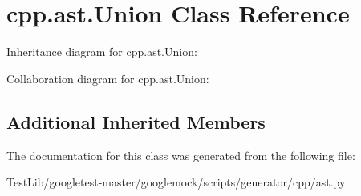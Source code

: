 \hypertarget{classcpp_1_1ast_1_1Union}{}\section{cpp.\+ast.\+Union Class Reference}
\label{classcpp_1_1ast_1_1Union}


Inheritance diagram for cpp.\+ast.\+Union\+:


Collaboration diagram for cpp.\+ast.\+Union\+:
\subsection*{Additional Inherited Members}


The documentation for this class was generated from the following file\+:\begin{DoxyCompactItemize}
\item 
Test\+Lib/googletest-\/master/googlemock/scripts/generator/cpp/ast.\+py\end{DoxyCompactItemize}
